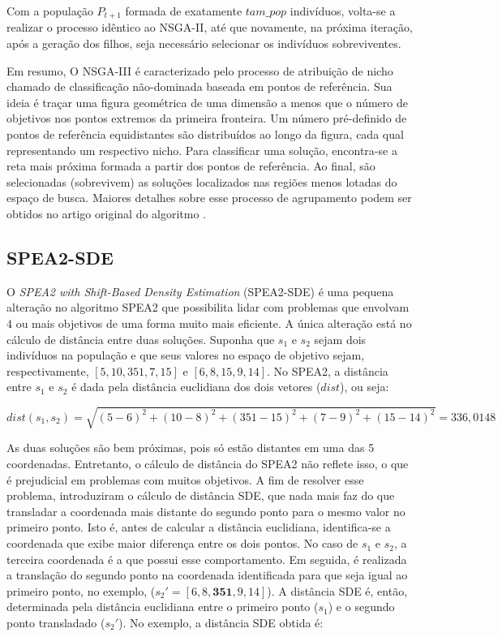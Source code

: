 Com a população $P_{t+1}$ formada de exatamente $tam\_pop$ indivíduos, volta-se a realizar o processo idêntico ao NSGA-II, até que novamente, na próxima iteração, após a geração dos filhos, seja necessário selecionar os indivíduos sobreviventes.

Em resumo, O NSGA-III é caracterizado pelo processo de atribuição de nicho chamado de classificação não-dominada baseada em pontos de referência. Sua ideia é traçar uma figura geométrica de uma dimensão a menos que o número de objetivos nos pontos extremos da primeira fronteira. Um número pré-definido de pontos de referência equidistantes são distribuídos ao longo da figura, cada qual representando um respectivo nicho. Para classificar uma solução, encontra-se a reta mais próxima formada a partir dos pontos de referência. Ao final, são selecionadas (sobrevivem) as soluções localizados nas regiões menos lotadas do espaço de busca. Maiores detalhes sobre esse processo de agrupamento podem ser obtidos no artigo original do algoritmo \cite{Deb2014}.

\subsection{SPEA2-SDE}

O \textit{SPEA2 with Shift-Based Density Estimation} (SPEA2-SDE) \cite{Spea2SDE} é uma pequena alteração no algoritmo SPEA2 que possibilita lidar com problemas que envolvam 4 ou mais objetivos de uma forma muito mais eficiente. A única alteração está no cálculo de distância entre duas soluções. Suponha que $s_1$ e $s_2$ sejam dois indivíduos na população e que seus valores no espaço de objetivo sejam, respectivamente, $[5, 10, 351, 7, 15]$ e $[6, 8, 15, 9, 14]$. No SPEA2, a distância entre $s_1$ e $s_2$ é dada pela distância euclidiana dos dois vetores ($dist$), ou seja:

\begin{equation}dist(s_1, s_2) = \sqrt{(5-6)^2 + (10-8)^2 + (351-15)^2 + (7-9)^2 + (15-14)^2} = 336,0148\end{equation}

As duas soluções são bem próximas, pois só estão distantes em uma das 5 coordenadas. Entretanto, o cálculo de distância do SPEA2 não reflete isso, o que é prejudicial em problemas com muitos objetivos. A fim de resolver esse problema, \cite{Spea2SDE} introduziram o cálculo de distância \ac{SDE}, que nada mais faz do que transladar a coordenada mais distante do segundo ponto para o mesmo valor no primeiro ponto. Isto é, antes de calcular a distância euclidiana, identifica-se a coordenada que exibe maior diferença entre os dois pontos. No caso de $s_1$ e $s_2$, a terceira coordenada é a que possui esse comportamento. Em seguida, é realizada a translação do segundo ponto na coordenada identificada para que seja igual ao primeiro ponto, no exemplo, ($s_2' = [6, 8, \textbf{351}, 9, 14]$). A distância SDE é, então, determinada pela distância euclidiana entre o primeiro ponto ($s_1$) e o segundo ponto transladado ($s_2'$). No exemplo, a distância SDE obtida é: 

